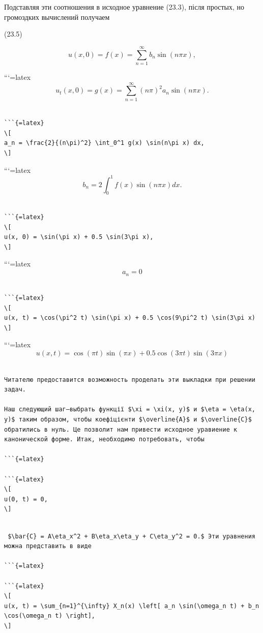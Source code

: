 \documentclass[
  ukrainian,
]{article}
\begin{document}
Подставляя эти соотношения в исходное уравнение (23.3), після простых,
но громоздких вычислений получаем

(23.5)

\[
u(x, 0) = f(x) = \sum_{n=1}^{\infty} b_n \sin(n\pi x),
\]

```{=latex}
\[
u_t(x, 0) = g(x) = \sum_{n=1}^{\infty} (n\pi)^2 a_n \sin(n\pi x).
\]

\begin{verbatim}

```{=latex}
\[
a_n = \frac{2}{(n\pi)^2} \int_0^1 g(x) \sin(n\pi x) dx,
\]
\end{verbatim}

```{=latex}
\[
b_n = 2 \int_0^1 f(x) \sin(n\pi x) dx.
\]

\begin{verbatim}

```{=latex}
\[
u(x, 0) = \sin(\pi x) + 0.5 \sin(3\pi x),
\]
\end{verbatim}

```{=latex}
\[
a_n=0
\]

\begin{verbatim}

```{=latex}
\[
u(x, t) = \cos(\pi^2 t) \sin(\pi x) + 0.5 \cos(9\pi^2 t) \sin(3\pi x)
\]
\end{verbatim}

```{=latex}
\[
u(x, t) = \cos(\pi t) \sin(\pi x) + 0.5 \cos(3\pi t) \sin(3\pi x)
\]

\begin{verbatim}

Читателю предоставится возможность проделать эти выкладки при решении задач.

Наш следующий шаг—выбрать функції $\xi = \xi(x, y)$ и $\eta = \eta(x, y)$ таким образом, чтобы коефіцієнти $\overline{A}$ и $\overline{C}$ обратились в нуль. Це позволит нам привести исходное уравиение к канонической форме. Итак, необходимо потребовать, чтобы

```{=latex}

```{=latex}
\[
u(0, t) = 0,
\]
\end{verbatim}

\begin{verbatim}

 $\bar{C} = A\eta_x^2 + B\eta_x\eta_y + C\eta_y^2 = 0.$ Эти уравнения можна представить в виде

```{=latex}

```{=latex}
\[
u(x, t) = \sum_{n=1}^{\infty} X_n(x) \left[ a_n \sin(\omega_n t) + b_n \cos(\omega_n t) \right],
\]
\end{verbatim}
\end{document}

